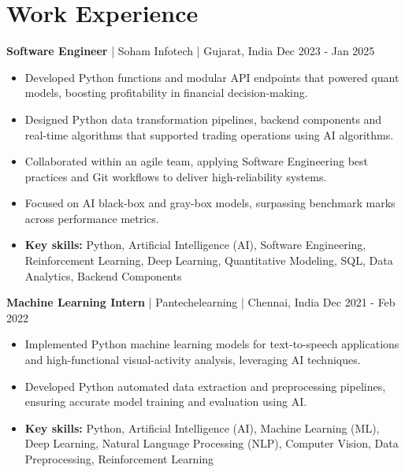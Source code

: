 \documentclass[a4paper,10pt]{article}
\begin{document}
\section*{Work Experience}
\textbf{Software Engineer} | Soham Infotech | Gujarat, India \hfill Dec 2023 - Jan 2025\par
\begin{itemize}
\item Developed Python functions and modular API endpoints that powered quant models, boosting profitability in financial decision-making.
\item Designed Python data transformation pipelines, backend components and real-time algorithms that supported trading operations using AI algorithms.
\item Collaborated within an agile team, applying Software Engineering best practices and Git workflows to deliver high-reliability systems.
\item Focused on AI black-box and gray-box models, surpassing benchmark marks across performance metrics.
\item \textbf{Key skills:} Python, Artificial Intelligence (AI), Software Engineering, Reinforcement Learning, Deep Learning, Quantitative Modeling, SQL, Data Analytics, Backend Components
\end{itemize}
\vspace{3pt}
\textbf{Machine Learning Intern} | Pantechelearning | Chennai, India \hfill Dec 2021 - Feb 2022\par
\begin{itemize}
\item Implemented Python machine learning models for text-to-speech applications and high-functional visual-activity analysis, leveraging AI techniques.
\item Developed Python automated data extraction and preprocessing pipelines, ensuring accurate model training and evaluation using AI.
\item \textbf{Key skills:} Python, Artificial Intelligence (AI), Machine Learning (ML), Deep Learning, Natural Language Processing (NLP), Computer Vision, Data Preprocessing, Reinforcement Learning
\end{itemize}
\vspace{3pt}
\end{document}

